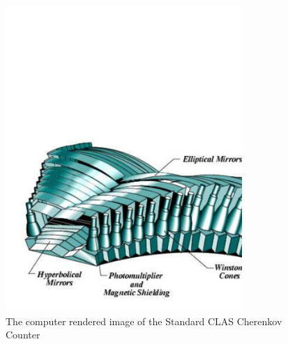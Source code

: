 \begin{figure}[h] %
\centering
\leavevmode \includegraphics[width=0.8\textwidth]{figuresEG4/FigExp/ccunit.pdf}  %
\caption[The Standard CLAS Cherenkov Counter]{The computer rendered image of the Standard CLAS Cherenkov Counter}
\label{figcherenkov}%
\end{figure}

